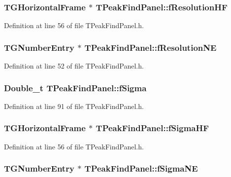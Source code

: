 \subsubsection[{fResolutionHF}]{\setlength{\rightskip}{0pt plus 5cm}TGHorizontalFrame $\ast$ {\bf TPeakFindPanel::fResolutionHF}\hspace{0.3cm}{\ttfamily  [private]}}\label{classTPeakFindPanel_acc966fc0c7fa132d0863212bdc11a38e}


Definition at line 56 of file TPeakFindPanel.h.
\subsubsection[{fResolutionNE}]{\setlength{\rightskip}{0pt plus 5cm}TGNumberEntry $\ast$ {\bf TPeakFindPanel::fResolutionNE}\hspace{0.3cm}{\ttfamily  [private]}}\label{classTPeakFindPanel_a9043e5dcdcf350b57b5198ef3e790a1d}


Definition at line 52 of file TPeakFindPanel.h.
\subsubsection[{fSigma}]{\setlength{\rightskip}{0pt plus 5cm}Double\_\-t {\bf TPeakFindPanel::fSigma}\hspace{0.3cm}{\ttfamily  [protected]}}\label{classTPeakFindPanel_ad969f6854bbc7fc38e2091d0975d50e2}


Definition at line 91 of file TPeakFindPanel.h.
\subsubsection[{fSigmaHF}]{\setlength{\rightskip}{0pt plus 5cm}TGHorizontalFrame $\ast$ {\bf TPeakFindPanel::fSigmaHF}\hspace{0.3cm}{\ttfamily  [private]}}\label{classTPeakFindPanel_a031d9ec5bf000c5547391bcddc713c00}


Definition at line 56 of file TPeakFindPanel.h.
\subsubsection[{fSigmaNE}]{\setlength{\rightskip}{0pt plus 5cm}TGNumberEntry $\ast$ {\bf TPeakFindPanel::fSigmaNE}\hspace{0.3cm}{\ttfamily  [private]}}\label{classTPeakFindPanel_a58cf52897f07d99bb5ba86a17edd268a}


